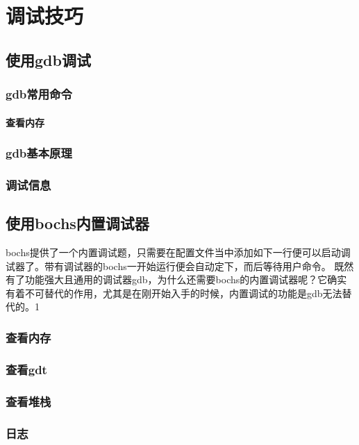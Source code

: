 \chapter{调试技巧}
\section{使用gdb调试}
\subsection{gdb常用命令}
\subsubsection{查看内存}
\subsection{gdb基本原理}
\subsection{调试信息}

\section{使用bochs内置调试器}
bochs提供了一个内置调试题，只需要在配置文件当中添加如下一行便可以启动调试器了。带有调试器的bochs一开始运行便会自动定下，而后等待用户命令。
既然有了功能强大且通用的调试器gdb，为什么还需要bochs的内置调试器呢？它确实有着不可替代的作用，尤其是在刚开始入手的时候，内置调试的功能是gdb无法替代的。1
\subsection{查看内存}
\subsection{查看gdt}
\subsection{查看堆栈}
\subsection{日志}
